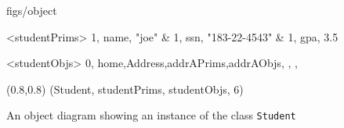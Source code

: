 






\begin {figure}


\Draw

 {figs/object}


\Indirect \Table <studentPrims>
{  1, name, "joe" 		&
   1, ssn,  "183-22-4543"		&
   1, gpa,  3.5		
}


\Indirect \Table <studentObjs>
 {  0, home,Address,addrAPrims,addrAObjs, , , }
  


\Scale (0.8,0.8)
\OD (Student, studentPrims, studentObjs, 6)
    
\EndDraw

\caption {An object diagram showing an instance
of the class \texttt {Student}}

\label {fig:simpleStudent}

\end {figure}



